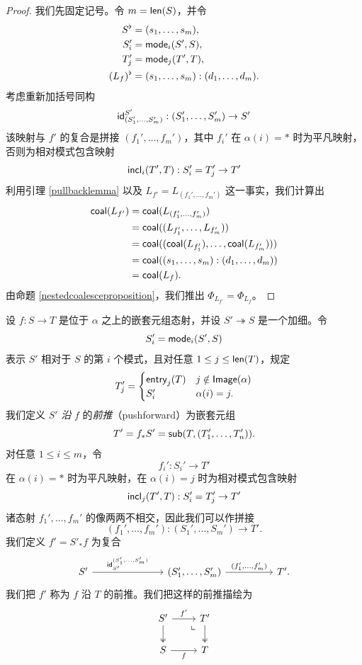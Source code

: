 \begin{proof}
    我们先固定记号。令 $m = \mathsf{len}(S)$，并令
    \begin{align*}
    S^\flat & = (s_1,\dots,s_m),\\
    S_i' & = \mathsf{mode}_i(S',S),\\
    T_j' & = \mathsf{mode}_j(T',T),\\
    (L_f)^\flat & = (s_1,\dots,s_m):(d_1,\dots,d_m).
    \end{align*}
    考虑重新加括号同构
    \[
    \mathsf{id}_{(S_1',\dots,S_m')}^{S'}:(S_1',\dots,S_m') \to S'
    \]
    该映射与 $f'$ 的复合是拼接 $(f_1',\dots,f_m')$，其中 $f_i'$ 在 $\alpha(i) = *$ 时为平凡映射，否则为相对模式包含映射
    \[
    \mathsf{incl}_i(T',T):S_i' = T_j' \to T'
    \]
    利用引理 \ref{pullbacklemma} 以及 $L_{f'} = L_{(f_1',\dots,f_m')}$ 这一事实，我们计算出
    \begin{align*}
    \mathsf{coal}(L_{f'}) & = \mathsf{coal}(L_{(f_1',\dots,f_m')})\\
    & = \mathsf{coal}((L_{f_1'},\dots,L_{f_m'}))\\
    & = \mathsf{coal}((\mathsf{coal}(L_{f_1'}),\dots,\mathsf{coal}(L_{f_m'}) ) )\\
    & = \mathsf{coal}((s_1,\dots,s_m):(d_1,\dots,d_m))\\
    & = \mathsf{coal}(L_f).
    \end{align*}
    由命题 \ref{nestedcoalesceproposition}，我们推出 $\Phi_{L_{f'}} = \Phi_{L_f}$。
\end{proof}

\begin{construction}[前推]
    设 $f:S \to T$ 是位于 $\alpha$ 之上的嵌套元组态射，并设 $S' \twoheadrightarrow S$ 是一个加细。令
    \[
    S_i' = \mathsf{mode}_i(S',S)
    \]
    表示 $S'$ 相对于 $S$ 的第 $i$ 个模式，且对任意 $1 \leq j \leq \mathsf{len}(T)$，规定
    \[
    T_j' =
    \begin{cases}
    \mathsf{entry}_j(T) & j \notin \mathsf{Image}(\alpha) \\
    S'_i & \alpha(i) = j.
    \end{cases}
    \]
    我们定义 $S'$ {\it 沿} $f$ 的{\it 前推}（pushforward）为嵌套元组
    \[
    T' = f_*S' = \mathsf{sub}(T,(T_1',\dots,T_n')).
    \]
    对任意 $1 \leq i \leq m$，令
    \[
    f_i':S_i' \to T'
    \]
    在 $\alpha(i) = *$ 时为平凡映射，在 $\alpha(i) = j$ 时为相对模式包含映射
    \[
    \mathsf{incl}_j(T',T):S_i' = T_j' \to T'
    \]
    诸态射 $f_1',\dots,f_m'$ 的像两两不相交，因此我们可以作拼接
    \[
    (f_1',\dots,f_m'):(S_1',\dots,S_m') \to T'.
    \]
    我们定义 $f' = S'_*f$ 为复合
    \[ \begin{tikzcd}
    S' \ar[rrr,"\id_{S'}^{(S_1'{,}\dots{,}S_m')}"] & & &  (S_1',\dots,S_m') \ar[rr,"(f_1'{,}\dots{,}f_m')"] & & T'.
    \end{tikzcd} \]
    我们把 $f'$ 称为 $f$ 沿 $T$ 的前推。我们把这样的前推描绘为
    \[ \begin{tikzcd}
    S' \ar[r,"f'"] \ar[d,two heads] & \arrow[dl, phantom, "\llcorner", very near start]T' \ar[d,two heads] \\
    S \ar[r,swap,"f"] & T\\
    \end{tikzcd} \]
\end{construction}

